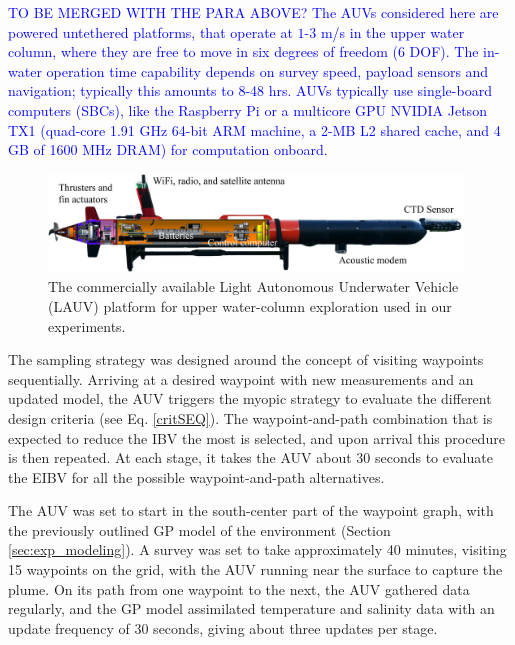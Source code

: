 \documentclass[aoas]{imsart}
\begin{document}
\textcolor{blue}{TO BE MERGED WITH THE PARA ABOVE? The AUVs considered here are powered untethered platforms, that
operate at $1$-$3$ m/s in the upper water column, where they are free
to move in six degrees of freedom (6 DOF). The in-water operation time
capability depends on survey speed, payload sensors and navigation;
typically this amounts to 8-48 hrs. AUVs typically use single-board
computers (SBCs), like the Raspberry Pi or a multicore GPU NVIDIA
Jetson TX1 (quad-core 1.91 GHz 64-bit ARM machine, a 2-MB L2 shared
cache, and 4 GB of 1600 MHz DRAM) for computation onboard.}

\begin{figure}[!h] 
\centering 
\includegraphics[width=0.98\textwidth]{Figures/harald.jpg}
\caption{The commercially available Light Autonomous Underwater
  Vehicle (LAUV) platform for upper water-column exploration used in
  our experiments.}
\label{fig:lauv}
\end{figure} 

The sampling strategy was designed around the concept of visiting
waypoints sequentially. Arriving at a desired waypoint with new
measurements and an updated model, the AUV triggers the myopic
strategy to evaluate the different design criteria (see
Eq. \eqref{critSEQ}). The waypoint-and-path combination that is
expected to reduce the IBV the most is selected, and upon arrival this
procedure is then repeated. At each stage, it takes the AUV about 30
seconds to evaluate the EIBV for all the possible waypoint-and-path
alternatives.

The AUV was set to start in the south-center part of the waypoint
graph, with the previously outlined GP model of the environment
(Section \ref{sec:exp_modeling}). A survey was set to take
approximately 40 minutes, visiting 15 waypoints on the grid, with the
AUV running near the surface to capture the plume. On its path from
one waypoint to the next, the AUV gathered data regularly, and the GP
model assimilated temperature and salinity data with an update
frequency of 30 seconds, giving about three updates per stage.
\end{document}
